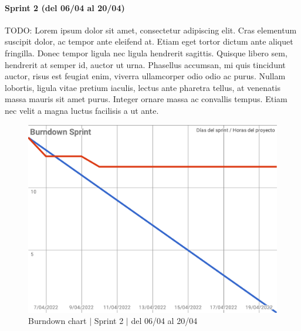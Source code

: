 \paragraph{Sprint 2 (del 06/04 al 20/04)}
TODO: Lorem ipsum dolor sit amet, consectetur adipiscing elit. Cras elementum suscipit dolor, ac tempor ante eleifend at. Etiam eget tortor dictum ante aliquet fringilla. Donec tempor ligula nec ligula hendrerit sagittis. Quisque libero sem, hendrerit at semper id, auctor ut urna. Phasellus accumsan, mi quis tincidunt auctor, risus est feugiat enim, viverra ullamcorper odio odio ac purus. Nullam lobortis, ligula vitae pretium iaculis, lectus ante pharetra tellus, at venenatis massa mauris sit amet purus. Integer ornare massa ac convallis tempus. Etiam nec velit a magna luctus facilisis a ut ante.
\begin{figure}[H]
    \centering
    \includegraphics[width=1\linewidth]{text/image/BurndownChart2.pdf}
    \caption{Burndown chart $|$ Sprint 2 $|$ del 06/04 al 20/04}
    \label{fig:burndown_chart_2}
\end{figure}

\newpage
